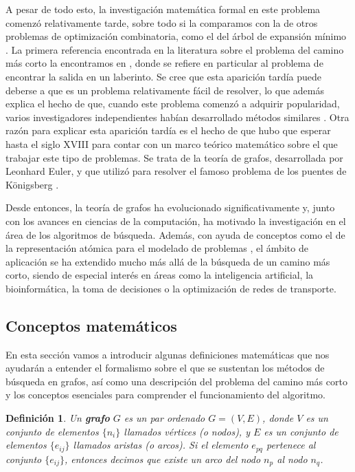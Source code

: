 \documentclass[a4paper,12pt]{article}
\newtheorem{defn}{Definición}
\begin{document}
A pesar de todo esto, la investigación matemática formal en este problema comenzó relativamente tarde, sobre todo si la comparamos con la de otros problemas de optimización combinatoria, como el del árbol de expansión mínimo \cite{boruuvka1926jistem}. La primera referencia encontrada en la literatura sobre el problema del camino más corto la encontramos en \cite{wiener1873ueber}, donde se refiere en particular al problema de encontrar la salida en un laberinto. Se cree que esta aparición tardía puede deberse a que es un problema relativamente fácil de resolver, lo que además explica el hecho de que, cuando este problema comenzó a adquirir popularidad, varios investigadores independientes habían desarrollado métodos similares \cite{schrijver2012history}. Otra razón para explicar esta aparición tardía es el hecho de que hubo que esperar hasta el siglo XVIII para contar con un marco teórico matemático sobre el que trabajar este tipo de problemas. Se trata de la teoría de grafos, desarrollada por Leonhard Euler, y que utilizó para resolver el famoso problema de los puentes de Königsberg \cite{euler1741solutio}.

Desde entonces, la teoría de grafos ha evolucionado significativamente y, junto con los avances en ciencias de la computación, ha motivado la investigación en el área de los algoritmos de búsqueda. Además, con ayuda de conceptos como el de la representación atómica para el modelado de problemas \cite[p. 57]{russell2016artificial}, el ámbito de aplicación se ha extendido mucho más allá de la búsqueda de un camino más corto, siendo de especial interés en áreas como la inteligencia artificial, la bioinformática, la toma de decisiones o la optimización de redes de transporte.

\subsection{Conceptos matemáticos} \label{sec:conceptos}

En esta sección vamos a introducir algunas definiciones matemáticas que nos ayudarán a entender el formalismo sobre el que se sustentan los métodos de búsqueda en grafos, así como una descripción del problema del camino más corto y los conceptos esenciales para comprender el funcionamiento del algoritmo.

\begin{defn}\label{def1}
Un \textbf{grafo} $G$ es un par ordenado $G=(V,E)$, donde $V$ es un conjunto de elementos $\{n_i\}$ llamados vértices (o nodos), y $E$ es un conjunto de elementos $\{e_{ij}\}$ llamados aristas (o arcos). Si el elemento $e_{pq}$ pertenece al conjunto $\{e_{ij}\}$, entonces decimos que existe un arco del nodo $n_p$ al nodo $n_q$.
\end{defn}
\end{document}

